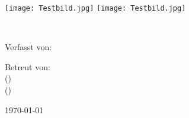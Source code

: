 \documentclass[../main.tex]{subfiles}
\begin{document}
\begin{titlepage}
	\centering
	\texttt{[image: Testbild.jpg]}\hspace{0.1\linewidth}
	\texttt{[image: Testbild.jpg]}
	\par\vspace{1cm}
	{\scshape\LARGE \thesistitle \par}
	\vspace{1cm}
	{\scshape\Large \firma \\ \schule\par}
	\vspace{1.5cm}
	{\huge\bfseries \untertitel\par}
	\vspace{2cm}
	Verfasst von: \\
	{\Large\itshape \autor\par}
	\vfill
	Betreut von:\\
	 (\firma)\\
	 (\schule)\\

	\vfill

	{\large \today\par}
\end{titlepage}
\newpage
\end{document}
